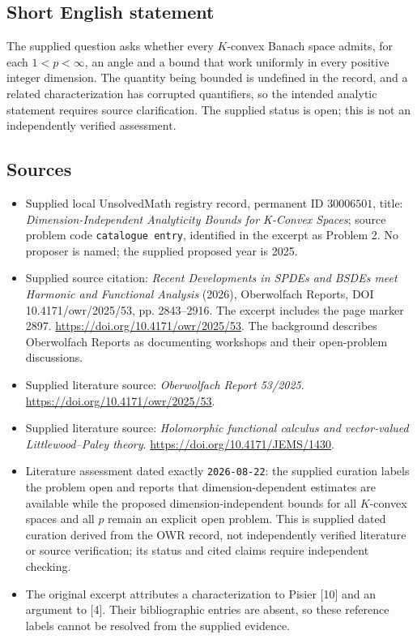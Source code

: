 \documentclass[11pt]{article}
\begin{document}
\subsection{Short English statement}
The supplied question asks whether every \(K\)-convex Banach space admits, for each \(1<p<\infty\), an angle and a bound that work uniformly in every positive integer dimension. The quantity being bounded is undefined in the record, and a related characterization has corrupted quantifiers, so the intended analytic statement requires source clarification. The supplied status is open; this is not an independently verified assessment.
\subsection{Sources}
\begin{itemize}
\item Supplied local UnsolvedMath registry record, permanent ID \(30006501\), title: \emph{Dimension-Independent Analyticity Bounds for K-Convex Spaces}; source problem code \texttt{catalogue entry}, identified in the excerpt as Problem 2. No proposer is named; the supplied proposed year is 2025.
\item Supplied source citation: \emph{Recent Developments in SPDEs and BSDEs meet Harmonic and Functional Analysis} (2026), Oberwolfach Reports, DOI 10.4171/owr/2025/53, pp. 2843--2916. The excerpt includes the page marker 2897. \url{https://doi.org/10.4171/owr/2025/53}. The background describes Oberwolfach Reports as documenting workshops and their open-problem discussions.
\item Supplied literature source: \emph{Oberwolfach Report 53/2025}. \url{https://doi.org/10.4171/owr/2025/53}.
\item Supplied literature source: \emph{Holomorphic functional calculus and vector-valued Littlewood--Paley theory}. \url{https://doi.org/10.4171/JEMS/1430}.
\item Literature assessment dated exactly \texttt{2026-08-22}: the supplied curation labels the problem open and reports that dimension-dependent estimates are available while the proposed dimension-independent bounds for all \(K\)-convex spaces and all \(p\) remain an explicit open problem. This is supplied dated curation derived from the OWR record, not independently verified literature or source verification; its status and cited claims require independent checking.
\item The original excerpt attributes a characterization to Pisier [10] and an argument to [4]. Their bibliographic entries are absent, so these reference labels cannot be resolved from the supplied evidence.
\end{itemize}
\end{document}

